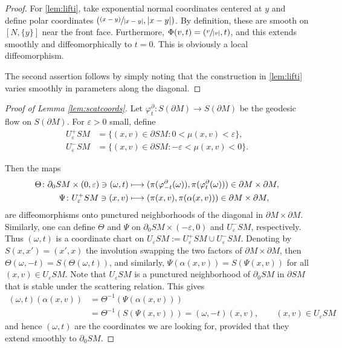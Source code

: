 \documentclass[11pt]{article}
\newcommand{\psfrac}[2]{\sfrac{(#1)}{#2}}
\def\mto{\mathchoice{\longmapsto}{\mapsto}{\mapsto}{\mapsto}}
\theoremstyle{plain}
\theoremstyle{definition}
\theoremstyle{remark}
\begin{document}
\begin{proof} For \eqref{lem:lifti}, take exponential normal coordinates centered at $y$ and define \hbox{polar} coordinates $(\psfrac{x-y}{|x-y|}, |x-y|)$.
By definition, these are smooth on $[N,\{y\}]$ near the front face. Furthermore, $\Phi(v,t) = (\sfrac{v}{|v|},t)$, and this
extends smoothly and diffeomorphically to $t=0$. This is obviously a local diffeomorphism.

The second assertion follows by simply noting that the construction in \eqref{lem:lifti} varies smoothly in parameters along
the diagonal.
\end{proof}

\begin{proof}[Proof of Lemma \ref{lem:scatcoords}]
Let $\varphi_t^\partial\colon S(\partial M) \to S(\partial M)$ be the geodesic flow on $S(\partial M)$. For $\varepsilon > 0$ small,
define
\begin{align*}
U_\varepsilon^+ SM &= \{(x,v) \in \partial SM: 0 < \mu(x,v) < \varepsilon\}, \\
U_\varepsilon^- SM &= \{(x,v) \in \partial SM: -\varepsilon < \mu(x,v)
< 0\}.
\end{align*}

Then the maps
\begin{align*}
\Theta \colon \partial_0 SM\times (0,\varepsilon) \ni (\omega,t) &\mto (\pi (\varphi_{-t}^\partial (\omega)),
\pi (\varphi_{t}^\partial (\omega))) \in \partial M\times \partial M, \\
\Psi \colon U_\varepsilon^+SM \ni (x,v) &\mto (\pi(x,v), \pi (\alpha(x,v))) \in \partial M\times \partial M,
\end{align*}
are diffeomorphisms onto punctured neighborhoods of the diagonal in $\partial M\times \partial M$. Similarly, one can
define $\Theta$ and $\Psi$ on $\partial_0 SM\times (-\varepsilon,0)$ and $U_\varepsilon^- SM$, respectively. Thus
$(\omega,t)$ is a coordinate chart on $U_\varepsilon SM := U_\varepsilon^+ SM \cup U_\varepsilon^- SM$. Denoting by $S(x,x') = (x',x)$ the involution swapping the two factors of $\partial M\times \partial M$, then $\Theta(\omega,-t) = S(\Theta(\omega,t))$, and similarly, $\Psi(\alpha(x,v)) = S(\Psi (x,v))$ for all $(x,v)\in U_\varepsilon SM$. Note that $U_\varepsilon SM$ is a punctured neighborhood of $\partial_0 SM$ in $\partial SM$ that is stable under the scattering relation. This gives
\begin{equation}
\begin{split}
(\omega,t) (\alpha(x,v)) &= \Theta^{-1} (\Psi (\alpha(x,v))) \\
&= \Theta^{-1} (S(\Psi(x,v))) = (\omega,-t)(x,v), \qquad (x,v)\in U_\varepsilon SM
\end{split}
\label{eq:proptomega}
\end{equation}
and hence $(\omega,t)$ are the coordinates we are looking for, provided that they extend smoothly to $\partial_0 SM$.


\end{proof}
\end{document}
